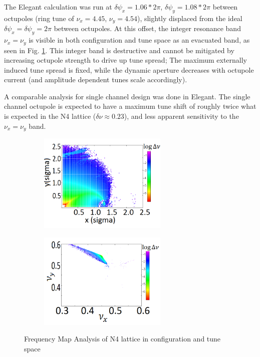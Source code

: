 The Elegant calculation was run at $\delta \psi_x = 1.06 *2 \pi$, $\delta \psi_y = 1.08 *2 \pi$ between octupoles (ring tune of $\nu_x=4.45$, $\nu_y=4.54$), slightly displaced from the ideal $\delta \psi_x =  \delta \psi_y = 2 \pi$ between octupoles. At this offset, the integer resonance band $\nu_x=\nu_y$ is visible in both configuration and tune space as an evacuated band, as seen in Fig. \ref{fma}. This integer band is destructive and cannot be mitigated by increasing octupole strength to drive up tune spread; The maximum externally induced tune spread is fixed, while the dynamic aperture decreases with octupole current (and amplitude dependent tunes scale accordingly). 

A comparable analysis for single channel design was done in Elegant. The single channel octupole is expected to have a maximum tune shift of roughly twice what is expected in the N4 lattice ($\delta \nu \approx 0.23$), and less apparent sensitivity to the $\nu_x=\nu_y$ band.

\begin{figure}[!htb]
	\begin{subfigure}[]{0.5\textwidth}   \centering
    \includegraphics*[width=174pt]{6.figures/paper_umer_oct_A}
	\end{subfigure}
	\begin{subfigure}[]{0.5\textwidth}   \centering
	\includegraphics*[width=174pt]{6.figures/paper_umer_oct_nu}
	\end{subfigure}
 	\caption{Frequency Map Analysis of N4 lattice in configuration and tune space}
   \label{fma}
\end{figure}




